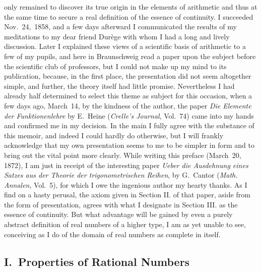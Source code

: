 \documentclass[twoside,openright]{article}
\begin{document}
only remained to discover its true origin in the elements of
arithmetic and thus at the same time to secure a real definition of
the essence of continuity. I succeeded Nov.\ 24,\ 1858, and a few days
afterward I communicated the results of my meditations to my dear
friend Durège with whom I had a long and lively discussion. Later I
explained these views of a scientific basis of arithmetic to a few of
my pupils, and here in Braunschweig read a paper upon the subject
before the scientific club of professors, but I could not make up my
mind to its publication, because, in the first place, the presentation
did not seem altogether simple, and further, the theory itself had
little promise. Nevertheless I had already half determined to select
this theme as subject for this occasion, when a few days ago,
March~14, by the kindness of the author, the paper \textit{Die
  Elemente der Funktionenlehre} by E.~Heine (\textit{Crelle's
  Journal}, Vol.~74) came into my hands and confirmed me in my
decision. In the main I fully agree with the substance of this memoir,
and indeed I could hardly do otherwise, but I will frankly acknowledge
that my own presentation seems to me to be simpler in form and to
bring out the vital point more clearly. While writing this preface
(March~20,~%
1872), I am just in receipt of the interesting paper \textit{Ueber die
  Ausdehnung eines Satzes aus der Theorie der trigonometrischen
  Reihen}, by G.~Cantor (\textit{Math. Annalen}, Vol.~5), for which I
owe the ingenious author my hearty thanks. As I find on a hasty
perusal, the axiom given in Section II. of that paper, aside from the
form of presentation, agrees with what I designate in Section III. as
the essence of continuity. But what advantage will be gained by even a
purely abstract definition of real numbers of a higher type, I am as
yet unable to see, conceiving as I do of the domain of real numbers as
complete in itself.\label{prefaceend}

\subsection*{I.\ Properties of Rational Numbers}
\end{document}
